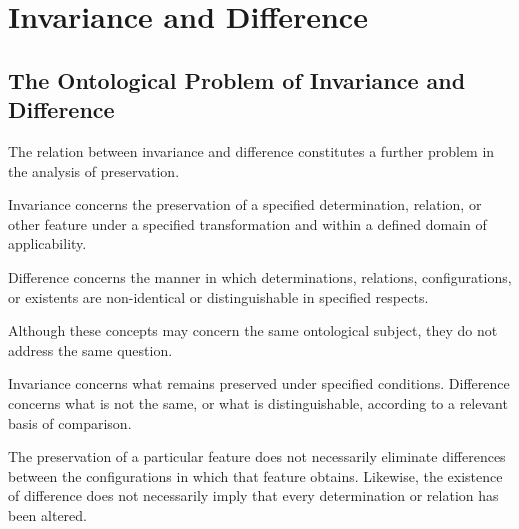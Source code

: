 %
%
%
%
%

\section{Invariance and Difference}
\label{sec:invariance-and-difference}

\subsection{The Ontological Problem of Invariance and Difference}

The relation between invariance and difference constitutes
a further problem in the analysis of preservation.

Invariance concerns the preservation of a specified
determination, relation, or other feature under a
specified transformation and within a defined domain
of applicability.

Difference concerns the manner in which determinations,
relations, configurations, or existents are non-identical
or distinguishable in specified respects.

Although these concepts may concern the same ontological
subject, they do not address the same question.

Invariance concerns what remains preserved under
specified conditions. Difference concerns what is
not the same, or what is distinguishable, according
to a relevant basis of comparison.

The preservation of a particular feature does not
necessarily eliminate differences between the
configurations in which that feature obtains.
Likewise, the existence of difference does not
necessarily imply that every determination or
relation has been altered.

